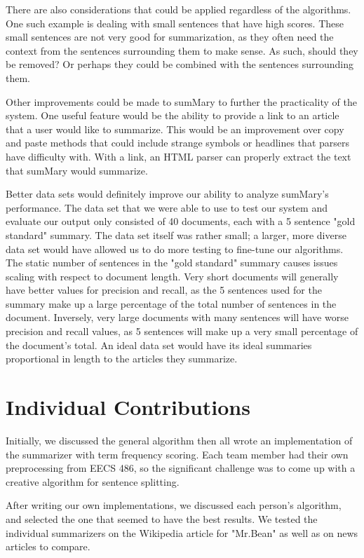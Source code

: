 \documentclass[11pt,a4paper]{article}
\begin{document}
There are also considerations that could be applied regardless of the algorithms. One such example is dealing with small sentences that have high scores. These small sentences are not very good for summarization, as they often need the context from the sentences surrounding them to make sense. As such, should they be removed? Or perhaps they could be combined with the sentences surrounding them.

Other improvements could be made to sumMary to further the practicality of the system. One useful feature would be the ability to provide a link to an article that a user would like to summarize. This would be an improvement over copy and paste methods that could include strange symbols or headlines that parsers have difficulty with. With a link, an HTML parser can properly extract the text that sumMary would summarize.

Better data sets would definitely improve our ability to analyze sumMary's performance. The data set that we were able to use to test our system and evaluate our output only consisted of 40 documents, each with a 5 sentence "gold standard" summary. The data set itself was rather small; a larger, more diverse data set would have allowed us to do more testing to fine-tune our algorithms. The static number of sentences in the "gold standard" summary causes issues scaling with respect to document length. Very short documents will generally have better values for precision and recall, as the 5 sentences used for the summary make up a large percentage of the total number of sentences in the document. Inversely, very large documents with many sentences will have worse precision and recall values, as 5 sentences will make up a very small percentage of the document's total. An ideal data set would have its ideal summaries proportional in length to the articles they summarize.

\section{Individual Contributions}
Initially, we discussed the general algorithm then all wrote an implementation of the summarizer with term frequency scoring. Each team member had their own preprocessing from EECS 486, so the significant challenge was to come up with a creative algorithm for sentence splitting.

After writing our own implementations, we discussed each person's algorithm, and selected the one that seemed to have the best results. We tested the individual summarizers on the Wikipedia article for "Mr.Bean" as well as on news articles to compare.
\end{document}
